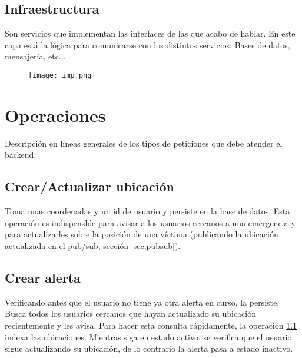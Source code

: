 \subsection{Infraestructura} 
Son servicios que implementan las interfaces de las que acabo de hablar.
En este capa está la lógica para comunicarse con los distintos servicios: Bases de datos, mensajería, etc...
\begin{figure}[H]
	\centering	
	\texttt{[image: imp.png]}
	\end{figure}


\section{Operaciones}

Descripción en líneas generales de los tipos de peticiones que debe atender el backend:

\subsection{Crear/Actualizar ubicación}\label{op:ubi}
Toma unas coordenadas y un id de usuario y persiste en la base de datos.
Esta operación es indispensble para avisar a los usuarios cercanos a una emergencia y para 
actualizarles sobre la posición de una víctima (publicando la ubicación actualizada en el pub/sub, sección \ref{sec:pubsub}).

\subsection{Crear alerta}
Verificando antes que el usuario no tiene ya otra alerta en curso, la persiste.
Busca todos los usuarios cercanos que hayan actualizado su ubicación recientemente y les avisa. Para hacer
esta consulta rápidamente, la operación \ref{op:ubi} indexa las ubicaciones.
Mientras siga en estado activo, se verifica que el usuario sigue actualizando su ubicación, de lo contrario la alerta pasa a estado inactivo.

